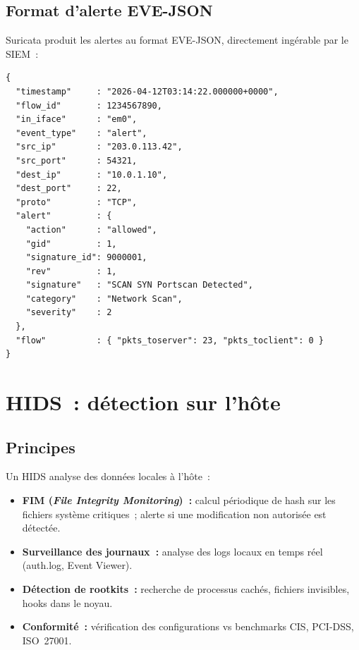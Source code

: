 \subsection{Format d'alerte EVE-JSON}

Suricata produit les alertes au format EVE-JSON, directement ingérable
par le SIEM~:

\begin{lstlisting}[style=StyleTerminal,
  caption={Alerte EVE-JSON Suricata},
  label={lst:eve-json}]
{
  "timestamp"     : "2026-04-12T03:14:22.000000+0000",
  "flow_id"       : 1234567890,
  "in_iface"      : "em0",
  "event_type"    : "alert",
  "src_ip"        : "203.0.113.42",
  "src_port"      : 54321,
  "dest_ip"       : "10.0.1.10",
  "dest_port"     : 22,
  "proto"         : "TCP",
  "alert"         : {
    "action"      : "allowed",
    "gid"         : 1,
    "signature_id": 9000001,
    "rev"         : 1,
    "signature"   : "SCAN SYN Portscan Detected",
    "category"    : "Network Scan",
    "severity"    : 2
  },
  "flow"          : { "pkts_toserver": 23, "pkts_toclient": 0 }
}
\end{lstlisting}

\section{HIDS~: détection sur l'hôte}
\label{sec:hids}

\subsection{Principes}

Un HIDS analyse des données locales à l'hôte~:
\begin{itemize}
  \item \textbf{FIM (\textit{File Integrity Monitoring})~:} calcul
        périodique de hash sur les fichiers système critiques~;
        alerte si une modification non autorisée est détectée.
  \item \textbf{Surveillance des journaux~:} analyse des logs locaux
        en temps réel (auth.log, Event Viewer).
  \item \textbf{Détection de rootkits~:} recherche de processus cachés,
        fichiers invisibles, hooks dans le noyau.
  \item \textbf{Conformité~:} vérification des configurations vs benchmarks
        CIS, PCI-DSS, ISO~27001.
\end{itemize}

